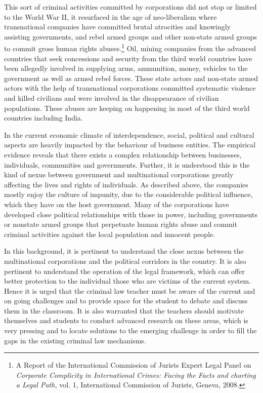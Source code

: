 \begin{multicols}{2}
\noi
This sort of criminal activities committed by corporations did not stop or limited to
the World War II, it resurfaced in the age of neo-liberalism where transnational
companies have committed brutal atrocities and knowingly assisting governments,
and rebel armed groups and other non-state armed groups to commit gross human
rights abuses.\footnote{A Report of the International Commission of Jurists Expert Legal Panel on \textit{Corporate Complicity in
International Crimes: Facing the Facts and charting a Legal Path,} vol. 1, International Commission of Jurists, Geneva, 2008.} Oil, mining companies from the advanced countries that seek concessions and security from the third world countries have been allegedly involved in supplying arms, ammunition, money, vehicles to the government as
well as armed rebel forces. These state actors and non-state armed actors with the
help of transnational corporations committed systematic violence and killed
civilians and were involved in the disappearance of civilian populations. These
abuses are keeping on happening in most of the third world countries including
India.

\noi
In the current economic climate of interdependence, social, political and cultural
aspects are heavily impacted by the behaviour of business entities. The empirical
evidence reveals that there exists a complex relationship between businesses,
individuals, communities and governments. Further, it is understood this is the
kind of nexus between government and multinational corporations greatly
affecting the lives and rights of individuals. As described above, the companies
mostly enjoy the culture of impunity, due to the considerable political influence,
which they have on the host government. Many of the corporations have developed
close political relationships with those in power, including governments or nonstate armed groups that perpetuate human rights abuse and commit criminal
activities against the local population and innocent people.

\noi
In this background, it is pertinent to understand the close nexus between the
multinational corporations and the political corridors in the country. It is also
pertinent to understand the operation of the legal framework, which can offer
better protection to the individual those who are victims of the current system.
Hence it is urged that the criminal law teacher must be aware of the current and on
going challenges and to provide space for the student to debate and discuss them in
the classroom. It is also warranted that the teachers should motivate themselves
and students to conduct advanced research on these areas, which is very pressing
and to locate solutions to the emerging challenge in order to fill the gaps in the
existing criminal law mechanisms.


\end{multicols}
